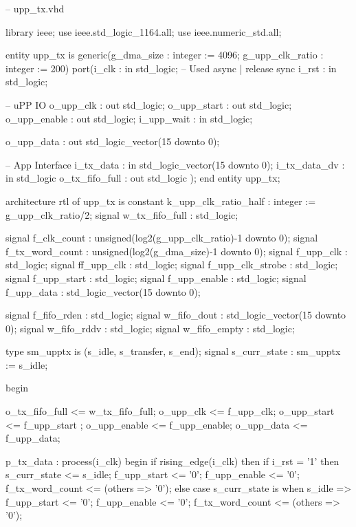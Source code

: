 \begin{VHDLlisting}[tabsize=2]
-- upp_tx.vhd

library ieee;
    use ieee.std_logic_1164.all;
    use ieee.numeric_std.all;
	
entity upp_tx is
    generic(g_dma_size      : integer := 4096;
            g_upp_clk_ratio : integer := 200)
	port(i_clk           : in    std_logic;
         -- Used async | release sync
         i_rst           : in    std_logic;
		 
         -- uPP IO
         o_upp_clk       :   out std_logic; 
         o_upp_start     :   out std_logic;
         o_upp_enable    :   out std_logic;
         i_upp_wait      : in    std_logic;
		 
         o_upp_data      :   out std_logic_vector(15 downto 0);
		 
         -- App Interface
         i_tx_data       : in    std_logic_vector(15 downto 0);
         i_tx_data_dv    : in    std_logic	
         o_tx_fifo_full  :   out std_logic	
    );
end entity upp_tx;

architecture rtl of upp_tx is
    constant k_upp_clk_ratio_half : integer := g_upp_clk_ratio/2;
    signal w_tx_fifo_full : std_logic;
	
    signal f_clk_count      : unsigned(log2(g_upp_clk_ratio)-1 downto 0);
    signal f_tx_word_count  : unsigned(log2(g_dma_size)-1 downto 0);
    signal f_upp_clk        : std_logic;
    signal ff_upp_clk       : std_logic;
    signal f_upp_clk_strobe : std_logic;
    signal f_upp_start      : std_logic;
    signal f_upp_enable     : std_logic;
    signal f_upp_data       : std_logic_vector(15 downto 0);
	                        
    signal f_fifo_rden      : std_logic;
    signal w_fifo_dout      : std_logic_vector(15 downto 0);
    signal w_fifo_rddv      : std_logic;
    signal w_fifo_empty     : std_logic;
	
    type sm_upptx is (s_idle, s_transfer, s_end);
    signal s_curr_state : sm_upptx := s_idle;

begin

    o_tx_fifo_full <= w_tx_fifo_full;
    o_upp_clk      <= f_upp_clk;
    o_upp_start    <= f_upp_start ;
    o_upp_enable   <= f_upp_enable;
    o_upp_data     <= f_upp_data;
	
    p_tx_data : process(i_clk)
    begin
        if rising_edge(i_clk) then
            if i_rst = '1' then
                s_curr_state <= s_idle;
                f_upp_start <= '0';
                f_upp_enable <= '0';
                f_tx_word_count <= (others => '0');
            else
                case s_curr_state is
                    when s_idle => 
                        f_upp_start <= '0';
                        f_upp_enable <= '0';
                        f_tx_word_count <= (others => '0');
						

\end{VHDLlisting}
